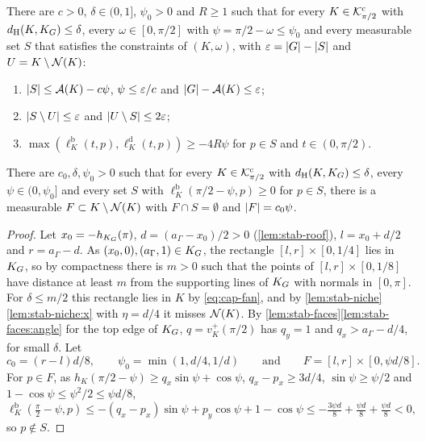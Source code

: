 \begin{proposition}\label{prop:stab-terminal}
There are $c>0$, $\delta\in(0,1]$, $\psi_0>0$ and $R\ge1$ such that for every
$K\in\mathcal{K}^{\mathrm{c}}_{\pi/2}$ with $d_{\mathrm{H}}(K,K_G)\le\delta$, every $\omega\in[0,\pi/2]$ with
$\psi=\pi/2-\omega\le\psi_0$ and every measurable set $S$ that satisfies the
constraints of $(K,\omega)$, with $\varepsilon=\lvert G\rvert-\lvert S\rvert$ and
$U=K\setminus\mathcal{N}(K)$:
\begin{enumerate}[label=(\alph*)]
\item\label{prop:stab-terminal:area} $\lvert S\rvert\le\mathcal{A}(K)-c\psi$,
$\psi\le\varepsilon/c$ and $\lvert G\rvert-\mathcal{A}(K)\le\varepsilon$;
\item\label{prop:stab-terminal:diff} $\lvert S\setminus U\rvert\le\varepsilon$ and
$\lvert U\setminus S\rvert\le2\varepsilon$;
\item\label{prop:stab-terminal:hall}
$\max(\ell^{\mathrm b}_K(t,p),\ell^{\mathrm d}_K(t,p))\ge-4R\psi$ for $p\in S$
and $t\in(0,\pi/2)$.
\end{enumerate}
\end{proposition}

\begin{lemma}\label{lem:stab-floor}
There are $c_0,\delta,\psi_0>0$ such that for every $K\in\mathcal{K}^{\mathrm{c}}_{\pi/2}$ with
$d_{\mathrm{H}}(K,K_G)\le\delta$, every $\psi\in(0,\psi_0]$ and every set $S$ with
$\ell^{\mathrm b}_K(\pi/2-\psi,p)\ge0$ for $p\in S$, there is a measurable
$F\subset K\setminus\mathcal{N}(K)$ with $F\cap S=\emptyset$ and $\lvert F\rvert=c_0\psi$.
\end{lemma}

\begin{proof}
Let $x_0=-h_{K_G}(\pi)$, $d=(a_\Gamma-x_0)/2>0$ (\cref{lem:stab-roof}),
$l=x_0+d/2$ and $r=a_\Gamma-d$. As $(x_0,0),(a_\Gamma,1)\in K_G$, the rectangle
$[l,r]\times[0,1/4]$ lies in $K_G$, so by compactness there is $m>0$ such that
the points of $[l,r]\times[0,1/8]$ have distance at least $m$ from the
supporting lines of $K_G$ with normals in $[0,\pi]$. For $\delta\le m/2$ this
rectangle lies in $K$ by \eqref{eq:cap-fan}, and by
\cref{lem:stab-niche}\ref{lem:stab-niche:x} with $\eta=d/4$ it misses
$\mathcal{N}(K)$. By \cref{lem:stab-faces}\ref{lem:stab-faces:angle} for the top edge
of $K_G$, $q=v^+_K(\pi/2)$ has $q_y=1$ and $q_x>a_\Gamma-d/4$, for small
$\delta$. Let
\[
  c_0=(r-l)d/8,\qquad\psi_0=\min(1,d/4,1/d)\qquad\text{and}\qquad
  F=[l,r]\times[0,\psi d/8].
\]
For $p\in F$, as
$h_K(\pi/2-\psi)\ge q_x\sin\psi+\cos\psi$, $q_x-p_x\ge3d/4$,
$\sin\psi\ge\psi/2$ and $1-\cos\psi\le\psi^2/2\le\psi d/8$,
\[
  \ell^{\mathrm b}_K(\tfrac\pi2-\psi,p)\le-(q_x-p_x)\sin\psi+p_y\cos\psi
    +1-\cos\psi\le-\tfrac{3\psi d}8+\tfrac{\psi d}8+\tfrac{\psi d}8<0,
\]
so $p\notin S$.
\end{proof}


